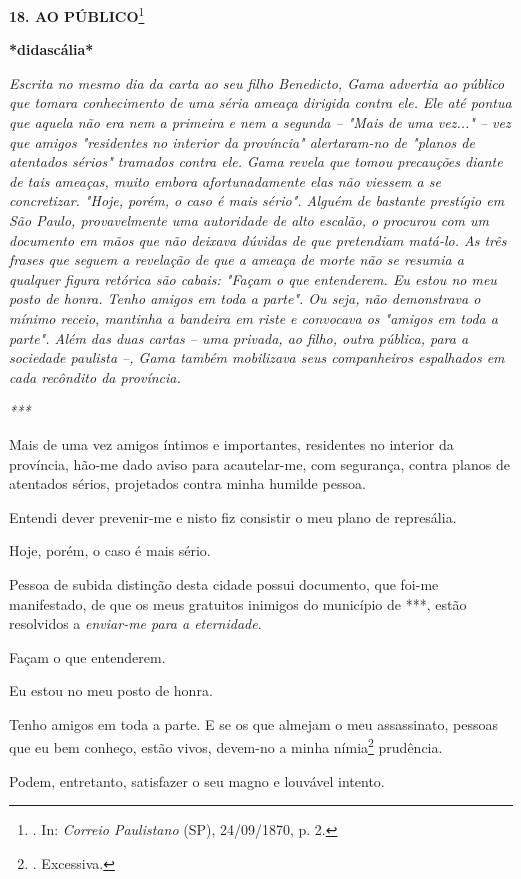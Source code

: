 \textbf{18. AO PÚBLICO}\footnote{. In: \emph{Correio Paulistano} (SP),
  24/09/1870, p. 2.}

\textbf{*didascália*}

\emph{Escrita no mesmo dia da carta ao seu filho Benedicto, Gama
advertia ao público que tomara conhecimento de uma séria ameaça dirigida
contra ele. Ele até pontua que aquela não era nem a primeira e nem a
segunda -- "Mais de uma vez..." -- vez que amigos "residentes no
interior da província" alertaram-no de "planos de atentados sérios"
tramados contra ele. Gama revela que tomou precauções diante de tais
ameaças, muito embora afortunadamente elas não viessem a se concretizar.
"Hoje, porém, o caso é mais sério". Alguém de bastante prestígio em São
Paulo, provavelmente uma autoridade de alto escalão, o procurou com um
documento em mãos que não deixava dúvidas de que pretendiam matá-lo. As
três frases que seguem a revelação de que a ameaça de morte não se
resumia a qualquer figura retórica são cabais: "Façam o que entenderem.
Eu estou no meu posto de honra. Tenho amigos em toda a parte". Ou seja,
não demonstrava o mínimo receio, mantinha a bandeira em riste e
convocava os "amigos em toda a parte". Além das duas cartas -- uma
privada, ao filho, outra pública, para a sociedade paulista --, Gama
também mobilizava seus companheiros espalhados em cada recôndito da
província. }

\emph{***}

Mais de uma vez amigos íntimos e importantes, residentes no interior da
província, hão-me dado aviso para acautelar-me, com segurança, contra
planos de atentados sérios, projetados contra minha humilde pessoa.

Entendi dever prevenir-me e nisto fiz consistir o meu plano de
represália.

Hoje, porém, o caso é mais sério.

Pessoa de subida distinção desta cidade possui documento, que foi-me
manifestado, de que os meus gratuitos inimigos do município de ***,
estão resolvidos a \emph{enviar-me para a eternidade}.

Façam o que entenderem.

Eu estou no meu posto de honra.

Tenho amigos em toda a parte. E se os que almejam o meu assassinato,
pessoas que eu bem conheço, estão vivos, devem-no a minha
nímia\footnote{. Excessiva.} prudência.

Podem, entretanto, satisfazer o seu magno e louvável intento.

